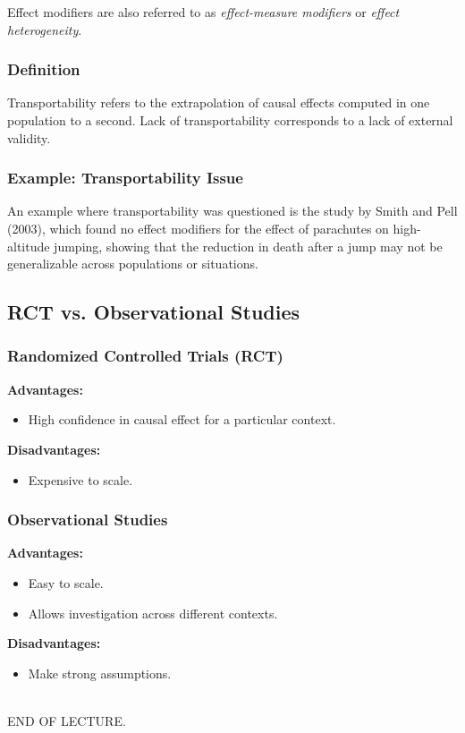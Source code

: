 Effect modifiers are also referred to as \emph{effect-measure modifiers} or \emph{effect heterogeneity}.

\subsubsection{Definition}

Transportability refers to the extrapolation of causal effects computed in one population to a second. Lack of transportability corresponds to a lack of external validity.

\subsubsection{Example: Transportability Issue}

An example where transportability was questioned is the study by Smith and Pell (2003), which found no effect modifiers for the effect of parachutes on high-altitude jumping, showing that the reduction in death after a jump may not be generalizable across populations or situations.

\subsection{RCT vs. Observational Studies}

\subsubsection{Randomized Controlled Trials (RCT)}

\textbf{Advantages:}
\begin{itemize}
    \item High confidence in causal effect for a particular context.
\end{itemize}

\textbf{Disadvantages:}
\begin{itemize}
    \item Expensive to scale.
\end{itemize}

\subsubsection{Observational Studies}

\textbf{Advantages:}
\begin{itemize}
    \item Easy to scale.
    \item Allows investigation across different contexts.
\end{itemize}

\textbf{Disadvantages:}
\begin{itemize}
    \item Make strong assumptions.
\end{itemize}

\\

END OF LECTURE.






